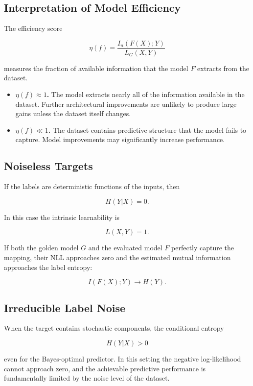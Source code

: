 \documentclass{article}
\begin{document}
\subsection{Interpretation of Model Efficiency}

The efficiency score

\[
\eta(f) = \frac{I_n(F(X);Y)}{L_G(X,Y)}
\]

measures the fraction of available information that the model $F$ extracts 
from the dataset.

\begin{itemize}[leftmargin=2em]

\item \textbf{$\eta(f)\approx 1$.}  
The model extracts nearly all of the information available in the dataset. 
Further architectural improvements are unlikely to produce large gains 
unless the dataset itself changes.

\item \textbf{$\eta(f)\ll 1$.}  
The dataset contains predictive structure that the model fails to capture. 
Model improvements may significantly increase performance.

\end{itemize}

\subsection{Noiseless Targets}

If the labels are deterministic functions of the inputs, then

\[
H(Y|X)=0.
\]

In this case the intrinsic learnability is

\[
L(X,Y)=1.
\]

If both the golden model $G$ and the evaluated model $F$ perfectly capture 
the mapping, their NLL approaches zero and the estimated mutual information 
approaches the label entropy:

\[
I(F(X);Y) \to H(Y).
\]

\subsection{Irreducible Label Noise}

When the target contains stochastic components, the conditional entropy

\[
H(Y|X) > 0
\]

even for the Bayes-optimal predictor. In this setting the negative 
log-likelihood cannot approach zero, and the achievable predictive 
performance is fundamentally limited by the noise level of the dataset.
\end{document}
